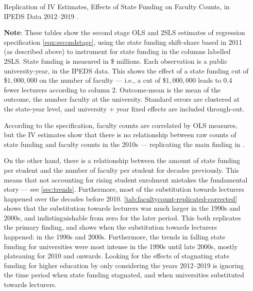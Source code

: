 \begin{table}[H]
    \singlespacing
    \centering
    \caption{Replication of IV Estimates, Effects of State Funding on Faculty Counts, in IPEDS Data 2012--2019 \citep{hinrichs2022state}.}
    \makebox[\textwidth][c]{}
    \label{tab:facultycount-replicate}
    \justify
    \footnotesize
    \textbf{Note}:
    These tables show the second stage OLS and 2SLS estimates of regression specification \eqref{eqn:secondstage}, using the state funding shift-share based in 2011 (as described above) to instrument for state funding in the columns labelled 2SLS.
    State funding is measured in \$ millions.
    Each observation is a public university-year, in the IPEDS data.
    This shows the effect of a state funding cut of \$$1,000,000$ on the number of faculty --- i.e.,
    a cut of \$$1,000,000$ leads to 0.4 fewer lecturers according to column 2.
    Outcome-mean is the mean of the outcome, the number faculty at the university.
    Standard errors are clustered at the state-year level, and university $+$ year fixed effects are included through-out.
\end{table}

According to the \cite{hinrichs2022state} specification, faculty counts are correlated by OLS measures, but the IV estimates show that there is no relationship between raw counts of state funding and faculty counts in the 2010s --- replicating the main finding in \cite{hinrichs2022state}.

On the other hand, there is a relationship between the amount of state funding per student and the number of faculty per student for decades previously.
This means that not accounting for rising student enrolment mistakes the fundamental story --- see \autoref{sec:trends}.
Furthermore, most of the substitution towards lecturers happened over the decades before 2010.
\autoref{tab:facultycount-replicated-corrected} shows that the substitution towards lecturers was much larger in the 1990s and 2000s, and indistinguishable from zero for the later period.
This both replicates the primary \cite{hinrichs2022state} finding, and shows when the substitution towards lecturers happened: in the 1990s and 2000s.
Furthermore, the trends in falling state funding for universities were most intense in the 1990s until late 2000s, mostly plateauing for 2010 and onwards.
Looking for the effects of stagnating state funding for higher education by only considering the years 2012--2019 is ignoring the time period when state funding stagnated, and when universities substituted towards lecturers.
